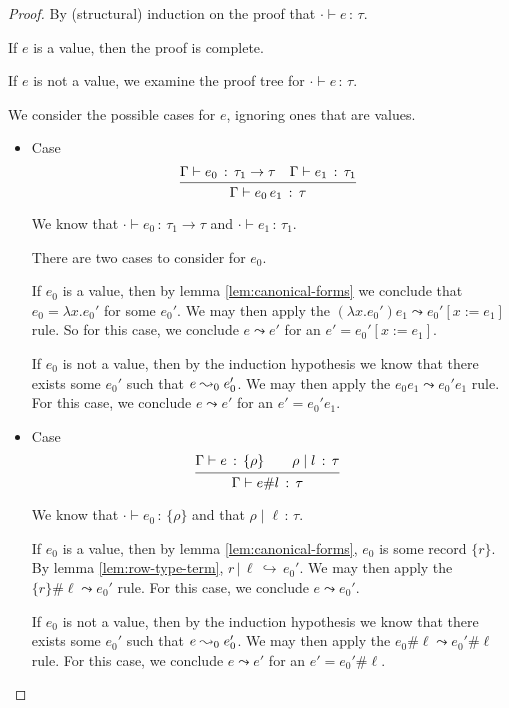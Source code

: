 \documentclass{article}
\newcommand{\G}{\Gamma}
\newcommand{\app}[2]{#1\,#2}
\newcommand{\hastp}[3]{#1 \vdash #2 \,:\, #3}
\newcommand{\haslbl}[3]{#1\;|\;#2\,:\, #3}
\newcommand{\haslbltm}[3]{#1\,|\,#2\,\hookrightarrow\, #3}
\newcommand{\step}[2]{#1 \leadsto #2}
\newcommand{\deduct}[3][]
{
  \begin{prooftree}
    \hypo{#2}
    \infer1[\text{#1}]{#3}
  \end{prooftree}
}
\begin{document}
\begin{proof}
By (structural) induction on the proof that $\hastp{\cdot}{e}{\tau}$.

If \(e\) is a value, then the proof is complete.

If \(e\) is not a value, we examine the proof tree for \(\hastp \cdot e \tau\).

We consider the possible cases for \(e\), ignoring ones that are values.

\begin{itemize}
\item Case
    \[
      \deduct
      {\hastp{\G}{e_0}{\tau_1\to\tau}
      \quad
      \hastp{\G}{e_1}{\tau_1}
      }
      {\hastp{\G}{\app{e_0}{e_1}}{\tau}}
      {}
    \]

    We know that \(\hastp \cdot {e_0} {\tau_1 \to \tau}\) and \(\hastp \cdot
    {e_1} \tau_1\).

    There are two cases to consider for \(e_0\).

    If \(e_0\) is a value, then by lemma \ref{lem:canonical-forms} we conclude
    that \(e_0 = \lambda x. e_0'\) for some \(e_0'\). We may then apply the
    \(\step {(\lambda x.e_0') e_1} {e_0'[x:=e_1]}\) rule. So for this case, we
    conclude \(\step e {e'}\) for an \(e' = e_0'[x:=e_1]\).

    If \(e_0\) is not a value, then by the induction hypothesis we know that
    there exists some \(e_0'\) such that \(\step e_0 {e_0'}\). We may then apply
    the \(\step {e_0 e_1}{e_0' e_1}\) rule. For this case, we conclude \(\step e
    {e'}\) for an \(e' = e_0' e_1\).

  \item Case
    \[
      \deduct
      {\hastp{\G}{e}{\{\rho\}}
      \qquad
      \haslbl{\rho}{l}{\tau}
      }
      {\hastp{\G}{e\#l}{\tau}}
      {}
    \]

    We know that \(\hastp \cdot {e_0} {\{\rho\}}\) and
    that \(\haslbl \rho \ell \tau\).

    If \(e_0\) is a value, then by lemma \ref{lem:canonical-forms}, \(e_0\) is
    some record \(\{r\}\). By lemma \ref{lem:row-type-term}, \(\haslbltm r \ell
    {e_0'}\). We may then apply the \(\step {\{r\} \# \ell} {e_0'}\) rule. For this
    case, we conclude \(\step e {e_0'}\).

    If \(e_0\) is not a value, then by the induction hypothesis we know that
    there exists some \(e_0'\) such that \(\step e_0 {e_0'}\). We may then apply
    the \(\step {e_0 \# \ell}{e_0' \# \ell}\) rule. For this case, we conclude
    \(\step e {e'}\) for an \(e' = e_0' \# \ell\).


\end{itemize}
\end{proof}
\end{document}
